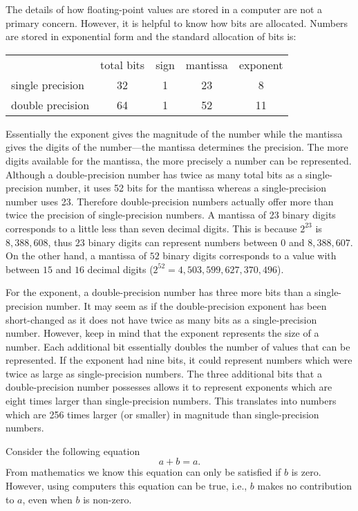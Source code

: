 The details of how floating-point values are stored in a computer are
not a primary concern.  However, it is helpful to know how bits are
allocated.  Numbers are stored in exponential form and the standard
allocation of bits is:
\begin{center}
\begin{tabular}{lcccc}
                 & total bits & sign & mantissa & exponent \\
single precision &    32      &  1   &    23    &    8     \\
double precision &    64      &  1   &    52    &    11    
\end{tabular}
\end{center}
Essentially the exponent gives the magnitude of the number while the
mantissa gives the digits of the number---the mantissa determines the
precision.  The more digits available for the mantissa, the more
precisely a number can be represented.  Although a double-precision
number has twice as many total bits as a single-precision number, it
uses 52 bits for the mantissa whereas a single-precision number uses
23.  Therefore double-precision numbers actually offer more than twice
the precision of single-precision numbers.  A mantissa of 23 binary
digits corresponds to a little less than seven decimal digits.  This
is because $2^{23}$ is $8,\!388,\!608$, thus $23$ binary digits can
represent numbers between $0$ and $8,\!388,\!607$.  On the other hand,
a mantissa of $52$ binary digits corresponds to a value with between
$15$ and $16$ decimal digits
($2^{52}=4,\!503,\!599,\!627,\!370,\!496$).

For the exponent, a double-precision number has three more bits than a
single-precision number.  It may seem as if the double-precision
exponent has been short-changed as it does not have twice as many bits
as a single-precision number.  However, keep in mind that the exponent
represents the size of a number.  Each additional bit essentially
doubles the number of values that can be represented.  If the exponent
had nine bits, it could represent numbers which were twice as large as
single-precision numbers.  The three additional bits that a
double-precision number possesses allows it to represent exponents
which are eight times larger than single-precision numbers.  This
translates into numbers which are 256 times larger (or smaller) in
magnitude than single-precision numbers.

Consider the following equation
\[
 a+b=a.
\]
From mathematics we know this equation can only be satisfied if $b$ is
zero.  However, using computers this equation can be true, i.e., $b$
makes no contribution to $a$, even when $b$ is non-zero.

